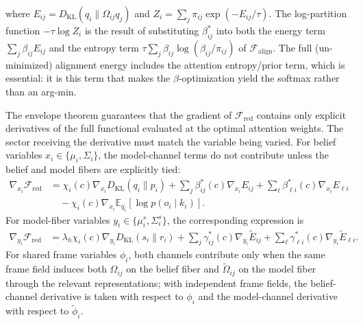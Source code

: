 \documentclass[11pt]{article}
\begin{document}
where $E_{ij} = D_{\mathrm{KL}}(q_i \| \Omega_{ij} q_j)$ and $Z_i = \sum_j \pi_{ij} \exp(-E_{ij}/\tau)$. The log-partition function $-\tau\log Z_i$ is the result of substituting $\beta_{ij}^*$ into both the energy term $\sum_j \beta_{ij} E_{ij}$ and the entropy term $\tau\sum_j \beta_{ij}\log(\beta_{ij}/\pi_{ij})$ of $\mathcal{F}_{\text{align}}$. The full (un-minimized) alignment energy includes the attention entropy/prior term, which is essential: it is this term that makes the $\beta$-optimization yield the softmax rather than an arg-min.

The envelope theorem guarantees that the gradient of $\mathcal{F}_{\mathrm{red}}$ contains only explicit derivatives of the full functional evaluated at the optimal attention weights. The sector receiving the derivative must match the variable being varied. For belief variables $x_i \in \{\mu_i,\Sigma_i\}$, the model-channel terms do not contribute unless the belief and model fibers are explicitly tied:
\begin{equation}
\begin{aligned}
\nabla_{x_i}\mathcal{F}_{\mathrm{red}}
&= \chi_i(c)\nabla_{x_i}D_{\mathrm{KL}}(q_i\|p_i)
+ \sum_j \beta^*_{ij}(c)\nabla_{x_i}E_{ij}
+ \sum_\ell \beta^*_{\ell i}(c)\nabla_{x_i}E_{\ell i} \\
&\quad - \chi_i(c)\nabla_{x_i}\mathbb{E}_{q_i}[\log p(o_i\mid k_i)].
\end{aligned}
\label{eq:envelope_gradient_belief}
\end{equation}
For model-fiber variables $y_i \in \{\mu^s_i,\Sigma^s_i\}$, the corresponding expression is
\begin{equation}
\begin{aligned}
\nabla_{y_i}\mathcal{F}_{\mathrm{red}}
&= \lambda_h\chi_i(c)\nabla_{y_i}D_{\mathrm{KL}}(s_i\|r_i)
+ \sum_j \gamma^*_{ij}(c)\nabla_{y_i}\tilde E_{ij}
+ \sum_\ell \gamma^*_{\ell i}(c)\nabla_{y_i}\tilde E_{\ell i}.
\end{aligned}
\label{eq:envelope_gradient_model}
\end{equation}
For shared frame variables $\phi_i$, both channels contribute only when the same frame field induces both $\Omega_{ij}$ on the belief fiber and $\tilde{\Omega}_{ij}$ on the model fiber through the relevant representations; with independent frame fields, the belief-channel derivative is taken with respect to $\phi_i$ and the model-channel derivative with respect to $\tilde{\phi}_i$.
\end{document}
